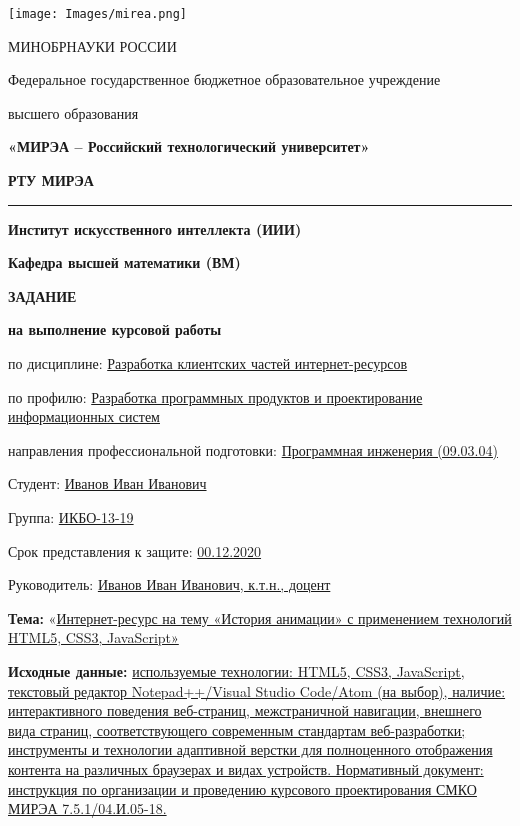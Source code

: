 \documentclass[12pt, a4paper]{extarticle}
\begin{document}
\fontsize{12pt}{1.08}\selectfont

\begin{center}
\texttt{[image: Images/mirea.png]}

\setlength{\parskip}{6pt}
МИНОБРНАУКИ РОССИИ 

Федеральное государственное бюджетное образовательное учреждение
\setlength{\parskip}{0pt}

высшего образования

\textbf{«МИРЭА -- Российский технологический университет»}

\fontsize{16pt}{1.08}\selectfont
\textbf{РТУ МИРЭА}
\fontsize{12pt}{1.08}\selectfont

\setlength{\parskip}{6pt}
\noindent\rule{\textwidth}{2pt}

\textbf{Институт искусственного интеллекта (ИИИ)}
\setlength{\parskip}{0pt}

\textbf{Кафедра высшей математики (ВМ)}

\bigskip
\textbf{ЗАДАНИЕ}

\textbf{на выполнение курсовой работы}

\end{center}

\justifying

\setlength{\parindent}{0in}
по дисциплине: \uline{Разработка клиентских частей
интернет-ресурсов}

по профилю: \uline{Разработка программных продуктов и проектирование
информационных систем}

направления профессиональной подготовки: \uline{Программная
инженерия (09.03.04)}

\medskip

Студент: \uline{Иванов Иван Иванович}

Группа: \uline{ИКБО-13-19}

Срок представления к защите: \uline{00.12.2020}

Руководитель: \uline{Иванов Иван Иванович, к.т.н., доцент}

\bigskip

\textbf{Тема:} «\uline{Интернет-ресурс на тему «История анимации» с
применением технологий HTML5, CSS3, JavaScript»}

\bigskip

\textbf{Исходные данные:} \uline{используемые технологии: HTML5,
CSS3, JavaScript, текстовый редактор Notepad++/Visual Studio Code/Atom
(на выбор), наличие: интерактивного поведения веб-страниц, межстраничной
навигации, внешнего вида страниц, соответствующего современным
стандартам веб-разработки; инструменты и технологии адаптивной верстки
для полноценного отображения контента на различных браузерах и видах
устройств. Нормативный документ: инструкция по организации и проведению
курсового проектирования СМКО МИРЭА 7.5.1/04.И.05-18.}
\end{document}
